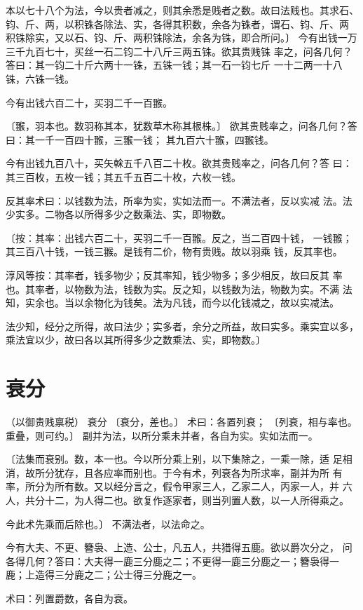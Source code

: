 \documentclass[a4paper,12pt,UTF8,twoside]{ctexbook}
\begin{document}
本以七十八个为法，今以贵者减之，则其余悉是贱者之数。故曰法贱也。其求石、 钧、斤、两，以积铢各除法、实，各得其积数，余各为铢者，谓石、钧、斤、两 积铢除实，又以石、钧、斤、两积铢除法，余各为铢，即合所问。〕 今有出钱一万三千九百七十，买丝一石二钧二十八斤三两五铢。欲其贵贱铢 率之，问各几何？答曰：其一钧二十斤六两十一铢，五铢一钱；其一石一钧七斤 一十二两一十八铢，六铢一钱。

今有出钱六百二十，买羽二千一百翭。

〔翭，羽本也。数羽称其本，犹数草木称其根株。〕 欲其贵贱率之，问各几何？答曰：其一千一百四十翭，三翭一钱； 其九百六十翭，四翭钱。

今有出钱九百八十，买矢榦五千八百二十枚。欲其贵贱率之，问各几何？答 曰：其三百枚，五枚一钱；其五千五百二十枚，六枚一钱。

反其率术曰：以钱数为法，所率为实，实如法而一。不满法者，反以实减 法。法少实多。二物各以所得多少之数乘法、实，即物数。

〔按：其率：出钱六百二十，买羽二千一百翭。反之，当二百四十钱， 一钱翭；其三百八十钱，一钱三翭。是钱有二价，物有贵贱。故以羽乘 钱，反其率也。

淳风等按：其率者，钱多物少；反其率知，钱少物多；多少相反，故曰反其 率也。其率者，以物数为法，钱数为实。反之知，以钱数为法，物数为实。不满 法知，实余也。当以余物化为钱矣。法为凡钱，而今以化钱减之，故以实减法。

法少知，经分之所得，故曰法少；实多者，余分之所益，故曰实多。乘实宜以多， 乘法宜以少，故曰各以其所得多少之数乘法、实，即物数。〕

\chapter{衰分}
（以御贵贱禀税） 衰分 〔衰分，差也。〕 术曰：各置列衰； 〔列衰，相与率也。重叠，则可约。〕 副并为法，以所分乘未并者，各自为实。实如法而一。

〔法集而衰别。数，本一也。今以所分乘上别，以下集除之，一乘一除，适 足相消，故所分犹存，且各应率而别也。于今有术，列衰各为所求率，副并为所 有率，所分为所有数。又以经分言之，假令甲家三人，乙家二人，丙家一人，并 六人，共分十二，为人得二也。欲复作逐家者，则当列置人数，以一人所得乘之。

今此术先乘而后除也。〕 不满法者，以法命之。

今有大夫、不更、簪袅、上造、公士，凡五人，共猎得五鹿。欲以爵次分之， 问各得几何？答曰：大夫得一鹿三分鹿之二；不更得一鹿三分鹿之一；簪袅得一 鹿；上造得三分鹿之二；公士得三分鹿之一。

术曰：列置爵数，各自为衰。
\end{document}
